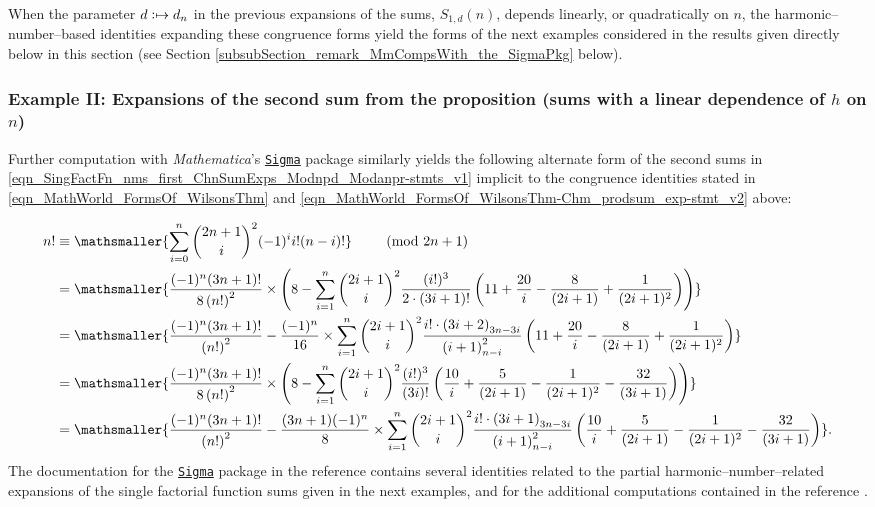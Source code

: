 \documentclass[12pt,reqno]{article}
\renewenvironment{subequations}{%
  \refstepcounter{equation}%
  \edef\theparentequation{\theequation}%
  \setcounter{parentequation}{\value{equation}}%
  \setcounter{equation}{0}%
  \def\theequation{\theparentequation.\alph{equation}}%
  \ignorespaces
}{%
  \setcounter{equation}{\value{parentequation}}%
  \ignorespacesafterend
}
\numberwithin{sfootnote}{section}
\numberwithin{equation}{section}
\theoremstyle{DefaultTheoremStyle}
\theoremstyle{definition}
\newcommand{\defmapsto}{\ensuremath{\vcentcolon\mapsto}}
\newcommand{\Mm}[0]{\emph{Mathematica}}
\newcommand{\SigmaPkg}[0]{%
     \href{http://www.risc.jku.at/research/combinat/software/Sigma/index.php}{%
     \texttt{Sigma}}
}
\newcommand{\StartGroupingSubEquations}{\begin{subequations}}
\newcommand{\EndGroupingSubEquations}{\end{subequations}}
\newcommand{\Pochhammer}[2]{\ensuremath{\left(#1\right)_{#2}}}
\begin{document}
When the parameter $d \defmapsto d_n$ 
in the previous expansions of the sums, $S_{1,d}(n)$, 
depends linearly, or quadratically on $n$, the harmonic--number--based 
identities expanding these congruence forms yield the forms of the 
next examples considered in the results given directly below in this 
section (see 
Section \ref{subsubSection_remark_MmCompsWith_the_SigmaPkg} below). 

\subsubsection{Example II: Expansions of the second sum from the proposition 
               (sums with a linear dependence of $h$ on $n$)} 
Further computation with \Mm's \SigmaPkg package 
similarly yields the following alternate form of the second sums in 
\eqref{eqn_SingFactFn_nms_first_ChnSumExps_Modnpd_Modanpr-stmts_v1} 
implicit to the congruence identities stated in 
\eqref{eqn_MathWorld_FormsOf_WilsonsThm} and 
\eqref{eqn_MathWorld_FormsOf_WilsonsThm-Chm_prodsum_exp-stmt_v2} above: 
\StartGroupingSubEquations 
\label{eqn_nFactMod2np1_CongruenceIdent_SigmaPkgAltSums} 
\begin{align} 
n! & \equiv 
     \mathsmaller{ 
     \sum\limits_{i=0}^{n} \binom{2n+1}{i}^2 (-1)^{i} 
     i! (n-i)! 
     } 
     \qquad \pmod{2n+1} \\ 
     & = 
     \mathsmaller{ 
     \frac{(-1)^{n} (3n+1)!}{8 \left(n!\right)^{2}} \times \left( 
     8 - \sum\limits_{i=1}^{n} \binom{2i+1}{i}^{2} 
     \frac{(i!)^{3}}{2 \cdot (3i+1)!} \left( 
     11 + \frac{20}{i} - \frac{8}{(2i+1)} + \frac{1}{(2i+1)^2} 
     \right) 
     \right) 
     } \\ 
\notag 
     & = 
     \mathsmaller{ 
     \frac{(-1)^{n} (3n+1)!}{\left(n!\right)^{2}} - 
     \frac{(-1)^{n}}{16} \times 
     \sum\limits_{i=1}^{n} \binom{2i+1}{i}^{2} 
     \frac{i! \cdot \Pochhammer{3i+2}{3n-3i}}{ 
     \Pochhammer{i+1}{n-i}^{2}} \left( 
     11 + \frac{20}{i} - \frac{8}{(2i+1)} + \frac{1}{(2i+1)^2} 
     \right) 
     } \\ 
     & = 
     \mathsmaller{ 
     \frac{(-1)^{n} (3n+1)!}{8 \left(n!\right)^{2}} \times \left( 
     8 - \sum\limits_{i=1}^{n} \binom{2i+1}{i}^{2} 
     \frac{(i!)^{3}}{(3i)!} \left( 
     \frac{10}{i} + \frac{5}{(2i+1)} - \frac{1}{(2i+1)^2} - 
     \frac{32}{(3i+1)} 
     \right) 
     \right) 
     } \\ 
\notag 
     & = 
     \mathsmaller{ 
     \frac{(-1)^{n} (3n+1)!}{\left(n!\right)^{2}} - 
     \frac{(3n+1) (-1)^{n}}{8} \times 
     \sum\limits_{i=1}^{n} \binom{2i+1}{i}^{2} 
     \frac{i! \cdot \Pochhammer{3i+1}{3n-3i}}{ 
     \Pochhammer{i+1}{n-i}^{2}} \left( 
     \frac{10}{i} + \frac{5}{(2i+1)} - \frac{1}{(2i+1)^2} - 
     \frac{32}{(3i+1)} 
     \right) 
     }. 
\end{align} 
\EndGroupingSubEquations 
The documentation for the \SigmaPkg package in the 
reference \citep[Ex.\ 3.3]{SYMB-SUM-COMB-SIGMAPKGDOCS} 
contains several identities 
related to the partial harmonic--number--related 
expansions of the single factorial function sums 
given in the next examples, and for the additional computations 
contained in the reference \citep{SUMMARYNBREF-STUB}. 
\end{document}
